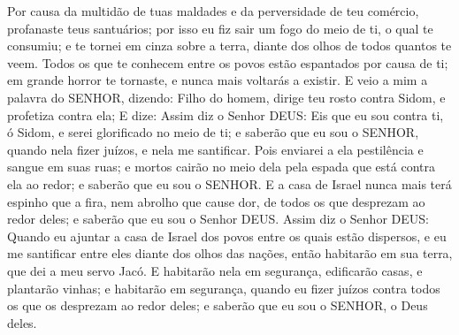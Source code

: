 {Por causa da multidão de tuas maldades e da perversidade de teu comércio, profanaste teus santuários; por isso eu fiz sair um fogo do meio de ti, o qual te consumiu; e te tornei em cinza sobre a terra, diante dos olhos de todos quantos te veem.
Todos os que te conhecem entre os povos estão espantados por causa de ti; em grande horror te tornaste, e nunca mais voltarás a existir.
E veio a mim a palavra do SENHOR, dizendo:
Filho do homem, dirige teu rosto contra Sidom, e profetiza contra ela;
E dize: Assim diz o Senhor DEUS: Eis que eu sou contra ti, ó Sidom, e serei glorificado no meio de ti; e saberão que eu sou o SENHOR, quando nela fizer juízos, e nela me santificar.
Pois enviarei a ela pestilência e sangue em suas ruas; e mortos cairão no meio dela pela espada que está contra ela ao redor; e saberão que eu sou o SENHOR.
E a casa de Israel nunca mais terá espinho que a fira, nem abrolho que cause dor, de todos os que desprezam ao redor deles; e saberão que eu sou o Senhor DEUS.
Assim diz o Senhor DEUS: Quando eu ajuntar a casa de Israel dos povos entre os quais estão dispersos, e eu me santificar entre eles diante dos olhos das nações, então habitarão em sua terra, que dei a meu servo Jacó.
E habitarão nela em segurança, edificarão casas, e plantarão vinhas; e habitarão em segurança, quando eu fizer juízos contra todos os que os desprezam ao redor deles; e saberão que eu sou o SENHOR, o Deus deles.

}
